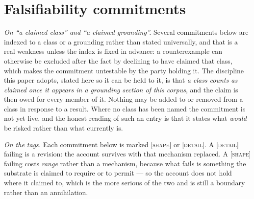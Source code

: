 \documentclass[11pt,a4paper]{article}
\theoremstyle{remark}
\begin{document}
\section{Falsifiability commitments}\label{sec:falsifiability}

\noindent\emph{On ``a claimed class'' and ``a claimed grounding''.} Several commitments below are
indexed to a class or a grounding rather than stated universally, and that is a real weakness unless
the index is fixed in advance: a counterexample can otherwise be excluded after the fact by declining
to have claimed that class, which makes the commitment untestable by the party holding it. The
discipline this paper adopts, stated here so it can be held to it, is that \emph{a class counts as
claimed once it appears in a grounding section of this corpus}, and the claim is then owed for every
member of it. Nothing may be added to or removed from a class in response to a result. Where no class
has been named the commitment is not yet live, and the honest reading of such an entry is that it
states what \emph{would} be risked rather than what currently is.

\noindent\emph{On the tags.} Each commitment below is marked \textsc{[shape]} or \textsc{[detail]}. A
\textsc{[detail]} failing is a revision: the account survives with that mechanism replaced. A
\textsc{[shape]} failing costs \emph{range} rather than a mechanism, because what fails is something
the substrate is claimed to require or to permit --- so the account does not hold where it claimed to,
which is the more serious of the two and is still a boundary rather than an annihilation.
\end{document}
